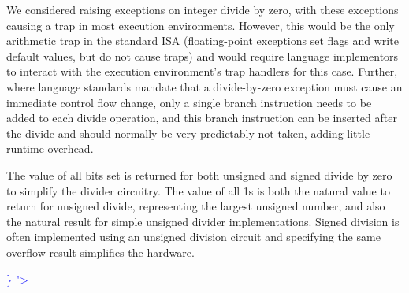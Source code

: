 \begin{commentary}
We considered raising exceptions on integer divide by zero, with these
exceptions causing a trap in most execution environments.  However,
this would be the only arithmetic trap in the standard ISA
(floating-point exceptions set flags and write default values, but do
not cause traps) and would require language implementors to interact
with the execution environment's trap handlers for this case.
Further, where language standards mandate that a divide-by-zero
exception must cause an immediate control flow change, only a single
branch instruction needs to be added to each divide operation, and
this branch instruction can be inserted after the divide and should
normally be very predictably not taken, adding little runtime
overhead.

The value of all bits set is returned for both unsigned and signed
divide by zero to simplify the divider circuitry.  The value of all 1s
is both the natural value to return for unsigned divide, representing
the largest unsigned number, and also the natural result for simple
unsigned divider implementations.  Signed division is often
implemented using an unsigned division circuit and specifying the same
overflow result simplifies the hardware.
\end{commentary}

\textcolor{blue}{
\} "\textgreater\\%
}
